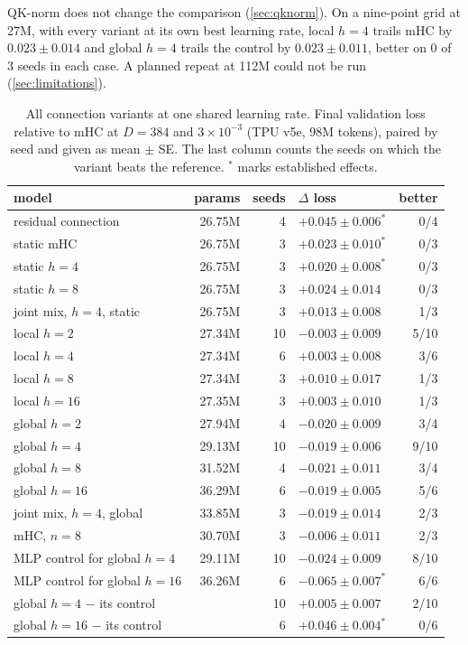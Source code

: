 \documentclass[11pt, a4paper]{article}
\newcommand{\lr}[1]{\ensuremath{#1 \times 10^{-3}}}
\newcommand{\est}{^{\ast}}
\begin{document}
QK-norm does not change the comparison (\cref{sec:qknorm}). On a nine-point grid at 27M, with every variant at its own best learning
rate, local $h = 4$ trails mHC by $0.023 \pm 0.014$ and global $h = 4$ trails the control by $0.023 \pm 0.011$, better on 0 of 3
seeds in each case. A planned repeat at 112M could not be run (\cref{sec:limitations}).

\begin{table}[ht]
  \centering
  \caption{All connection variants at one shared learning rate. Final validation loss relative to mHC at $D = 384$ and \lr{3} (TPU
    v5e, 98M tokens), paired by seed and given as mean $\pm$ SE. The last column counts the seeds on which the variant beats the
    reference. $\est$ marks established effects.}
  \label{tab:fixed-lr}
  \small
  \begin{tabular}{lrrlr}
    \toprule
    model & params & seeds & $\Delta$ loss & better \\
    \midrule
    residual connection & 26.75M & 4 & $+0.045 \pm 0.006\est$ & 0/4 \\
    static mHC & 26.75M & 3 & $+0.023 \pm 0.010\est$ & 0/3 \\
    static $h = 4$ & 26.75M & 3 & $+0.020 \pm 0.008\est$ & 0/3 \\
    static $h = 8$ & 26.75M & 3 & $+0.024 \pm 0.014$ & 0/3 \\
    joint mix, $h = 4$, static & 26.75M & 3 & $+0.013 \pm 0.008$ & 1/3 \\
    local $h = 2$ & 27.34M & 10 & $-0.003 \pm 0.009$ & 5/10 \\
    local $h = 4$ & 27.34M & 6 & $+0.003 \pm 0.008$ & 3/6 \\
    local $h = 8$ & 27.34M & 3 & $+0.010 \pm 0.017$ & 1/3 \\
    local $h = 16$ & 27.35M & 3 & $+0.003 \pm 0.010$ & 1/3 \\
    global $h = 2$ & 27.94M & 4 & $-0.020 \pm 0.009$ & 3/4 \\
    global $h = 4$ & 29.13M & 10 & $-0.019 \pm 0.006$ & 9/10 \\
    global $h = 8$ & 31.52M & 4 & $-0.021 \pm 0.011$ & 3/4 \\
    global $h = 16$ & 36.29M & 6 & $-0.019 \pm 0.005$ & 5/6 \\
    joint mix, $h = 4$, global & 33.85M & 3 & $-0.019 \pm 0.014$ & 2/3 \\
    mHC, $n = 8$ & 30.70M & 3 & $-0.006 \pm 0.011$ & 2/3 \\
    \midrule
    MLP control for global $h = 4$ & 29.11M & 10 & $-0.024 \pm 0.009$ & 8/10 \\
    MLP control for global $h = 16$ & 36.26M & 6 & $-0.065 \pm 0.007\est$ & 6/6 \\
    \midrule
    global $h = 4$ $-$ its control & & 10 & $+0.005 \pm 0.007$ & 2/10 \\
    global $h = 16$ $-$ its control & & 6 & $+0.046 \pm 0.004\est$ & 0/6 \\
    \bottomrule
  \end{tabular}
\end{table}
\end{document}
